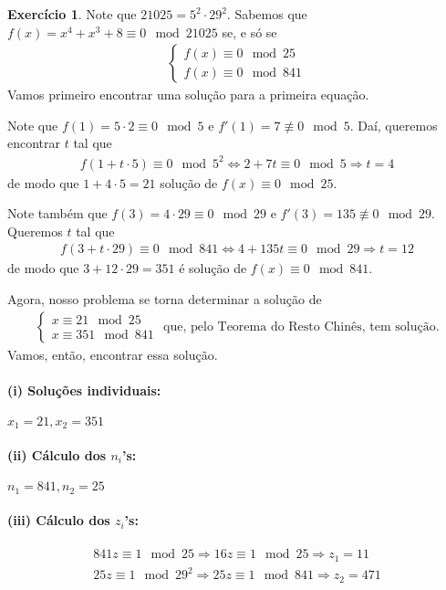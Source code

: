 \documentclass[a4paper,12pt]{article}
\theoremstyle{definition}
\newtheorem{exercise}{Exercício}%
\begin{document}
	\begin{exercise}
		Note que $21025 = 5^2\cdot 29^2$. Sabemos que $f(x) = x^4 + x^3 + 8 \equiv 0\mod 21025$ se, e só se
		\begin{align*}
			\begin{cases}
			f(x)\equiv 0\mod 25 \\
			f(x)\equiv 0\mod 841
			\end{cases}
		\end{align*}
		Vamos primeiro encontrar uma solução para a primeira equação. 
		\par\vspace{0.3cm} Note que $f(1) = 5\cdot 2\equiv 0\mod 5$ e $f'(1) = 7\not\equiv 0\mod 5$. Daí, queremos encontrar $t$ tal que
		\begin{align*}
		f(1 + t\cdot 5) \equiv 0\mod 5^2 \Leftrightarrow 2 + 7t \equiv 0\mod 5 \Rightarrow t = 4
		\end{align*}
		de modo que $1 + 4\cdot 5 = 21$ solução de $f(x) \equiv 0\mod 25$.
		\par\vspace{0.3cm} Note também que $f(3) = 4\cdot 29 \equiv 0\mod 29$ e $f'(3) = 135\not\equiv 0\mod 29$. Queremos $t$ tal que
		\begin{align*}
		f(3+t\cdot 29) \equiv 0\mod 841 \Leftrightarrow 4 + 135t\equiv 0\mod 29 \Rightarrow t = 12
		\end{align*}
		de modo que $3 + 12\cdot 29 = 351$ é solução de $f(x)\equiv 0\mod 841$.
		\par\vspace{0.3cm} Agora, nosso problema se torna determinar a solução de 
		\begin{align*}
		\begin{cases}
		x\equiv 21\mod 25 \\
		x\equiv 351\mod 841
		\end{cases}\text{ que, pelo Teorema do Resto Chinês, tem solução.}
		\end{align*}
		Vamos, então, encontrar essa solução.
		\paragraph{(i) Soluções individuais:} $x_1 = 21, x_2 = 351$
		\paragraph{(ii) Cálculo dos $n_i$'s:} $n_1 = 841, n_2 = 25$
		\paragraph{(iii) Cálculo dos $z_i$'s:} 
		\begin{align*}
		841z\equiv 1\mod 25 \Rightarrow 16z\equiv 1\mod 25 \Rightarrow z_1 = 11\\
		25z\equiv 1\mod 29^2 \Rightarrow 25z\equiv 1\mod 841 \Rightarrow z_2 = 471\\
		\end{align*}

\end{exercise}
\end{document}
